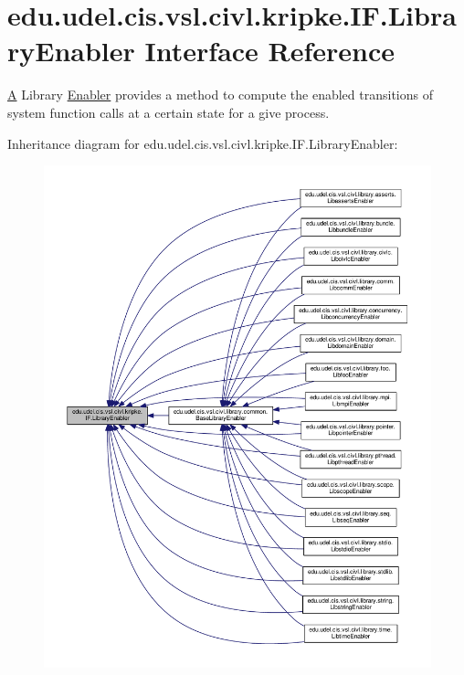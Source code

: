\hypertarget{interfaceedu_1_1udel_1_1cis_1_1vsl_1_1civl_1_1kripke_1_1IF_1_1LibraryEnabler}{}\section{edu.\+udel.\+cis.\+vsl.\+civl.\+kripke.\+I\+F.\+Library\+Enabler Interface Reference}
\label{interfaceedu_1_1udel_1_1cis_1_1vsl_1_1civl_1_1kripke_1_1IF_1_1LibraryEnabler}


\hyperlink{structA}{A} Library \hyperlink{interfaceedu_1_1udel_1_1cis_1_1vsl_1_1civl_1_1kripke_1_1IF_1_1Enabler}{Enabler} provides a method to compute the enabled transitions of system function calls at a certain state for a give process.  




Inheritance diagram for edu.\+udel.\+cis.\+vsl.\+civl.\+kripke.\+I\+F.\+Library\+Enabler\+:
\nopagebreak
\begin{figure}[H]
\begin{center}
\leavevmode
\includegraphics[width=350pt]{interfaceedu_1_1udel_1_1cis_1_1vsl_1_1civl_1_1kripke_1_1IF_1_1LibraryEnabler__inherit__graph}
\end{center}
\end{figure}
